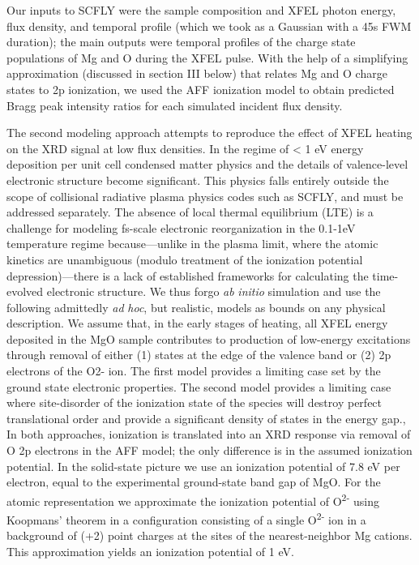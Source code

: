 Our inputs to SCFLY were the sample composition and XFEL photon energy,
flux density, and temporal profile (which we took as a Gaussian with a
45s FWM duration); the main outputs were temporal profiles of the charge
state populations of Mg and O during the XFEL pulse. With the help of a
simplifying approximation (discussed in section III below) that relates
Mg and O charge states to 2p ionization, we used the AFF ionization
model to obtain predicted Bragg peak intensity ratios for each simulated
incident flux density.

The second modeling approach attempts to reproduce the effect of XFEL
heating on the XRD signal at low flux densities. In the regime of
\textless{} 1 eV energy deposition per unit cell condensed matter
physics and the details of valence-level electronic structure become
significant. This physics falls entirely outside the scope of
collisional radiative plasma physics codes such as SCFLY, and must be
addressed separately. The absence of local thermal equilibrium (LTE) is
a challenge for modeling fs-scale electronic reorganization in the
0.1-1eV temperature regime because---unlike in the plasma limit, where
the atomic kinetics are unambiguous (modulo treatment of the ionization
potential depression)---there is a lack of established frameworks for
calculating the time-evolved electronic structure. We thus forgo
\emph{ab} \emph{initio} simulation and use the following admittedly
\emph{ad} \emph{hoc}, but realistic, models as bounds on any physical
description. We assume that, in the early stages of heating, all XFEL
energy deposited in the MgO sample contributes to production of
low-energy excitations through removal of either (1) states at the edge
of the valence band or (2) 2p electrons of the O2- ion. The first model
provides a limiting case set by the ground state electronic properties.
The second model provides a limiting case where site-disorder of the
ionization state of the species will destroy perfect translational order
and provide a significant density of states in the energy gap., In both
approaches, ionization is translated into an XRD response via removal of
O 2p electrons in the AFF model; the only difference is in the assumed
ionization potential. In the solid-state picture we use an ionization
potential of 7.8 eV per electron, equal to the experimental ground-state
band gap of MgO. For the
atomic representation we approximate the ionization potential of
O\textsuperscript{2-} using Koopmans' theorem in a configuration
consisting of a single O\textsuperscript{2-} ion in a background of (+2)
point charges at the sites of the nearest-neighbor Mg cations. This
approximation yields an ionization potential of 1 eV.

